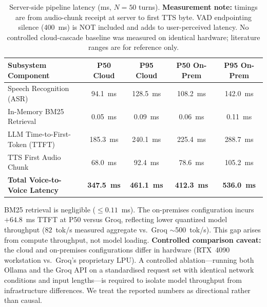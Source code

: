 \documentclass[11pt,a4paper]{article}
\begin{document}
\begin{table}[htbp]
\centering
\small
\caption{Server-side pipeline latency (ms, $N{=}50$ turns). \textbf{Measurement note:} timings are from audio-chunk receipt at server to first TTS byte. VAD endpointing silence (400~ms) is NOT included and adds to user-perceived latency. No controlled cloud-cascade baseline was measured on identical hardware; literature ranges are for reference only.}
\label{tab:latency_breakdown}
\renewcommand{\arraystretch}{1.3}
\begin{tabularx}{\textwidth}{lcccc}
\toprule
\textbf{Subsystem Component} & \textbf{P50 Cloud} & \textbf{P95 Cloud} & \textbf{P50 On-Prem} & \textbf{P95 On-Prem} \\
\midrule
Speech Recognition (ASR) & 94.1~ms & 128.5~ms & 108.2~ms & 142.0~ms \\
In-Memory BM25 Retrieval & 0.05~ms & 0.09~ms & 0.06~ms & 0.11~ms \\
LLM Time-to-First-Token (TTFT) & 185.3~ms & 240.1~ms & 225.4~ms & 288.7~ms \\
TTS First Audio Chunk & 68.0~ms & 92.4~ms & 78.6~ms & 105.2~ms \\
\midrule
\textbf{Total Voice-to-Voice Latency} & \textbf{347.5~ms} & \textbf{461.1~ms} & \textbf{412.3~ms} & \textbf{536.0~ms} \\
\bottomrule
\end{tabularx}
\end{table}

BM25 retrieval is negligible ($\le 0.11$~ms). The on-premises configuration incurs $+64.8$~ms TTFT at P50 versus Groq, reflecting lower quantized model throughput ($82$~tok/s measured aggregate vs.\ Groq $\sim$500~tok/s). This gap arises from compute throughput, not model loading. \textbf{Controlled comparison caveat:} the cloud and on-premises configurations differ in hardware (RTX~4090 workstation vs.\ Groq's proprietary LPU). A controlled ablation---running both Ollama and the Groq API on a standardised request set with identical network conditions and input lengths---is required to isolate model throughput from infrastructure differences. We treat the reported numbers as directional rather than causal.
\end{document}
